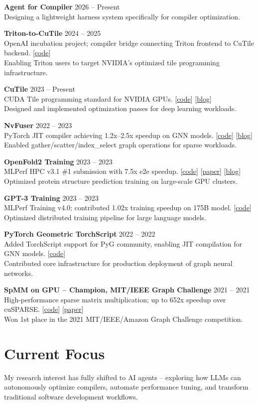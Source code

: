 \documentclass[11pt,a4paper]{article}
\newcommand{\projectentry}[5]{%
    \noindent\textbf{#1} \hfill #2 \\[2pt]
    #4 \hfill {\small #3} \\[1pt]
    #5\par\vspace{8pt}%
}
\newcommand{\projectentrysingle}[3]{%
    \noindent\textbf{#1} \hfill #2 \\[2pt]
    #3\par\vspace{8pt}%
}
\begin{document}
\projectentrysingle{Agent for Compiler}{2026 -- Present}
{Designing a lightweight harness system specifically for compiler optimization.}

\projectentry{Triton-to-CuTile}{2024 -- 2025}{[\href{https://github.com/triton-lang/Triton-to-tile-IR}{code}]}
{OpenAI incubation project; compiler bridge connecting Triton frontend to CuTile backend.}
{Enabling Triton users to target NVIDIA's optimized tile programming infrastructure.}

\projectentry{CuTile}{2023 -- Present}{[\href{https://github.com/NVIDIA/cutile-python}{code}] [\href{https://developer.nvidia.com/blog/tag/cutile/}{blog}]}
{CUDA Tile programming standard for NVIDIA GPUs.}
{Designed and implemented optimization passes for deep learning workloads.}

\projectentry{NvFuser}{2022 -- 2023}{[\href{https://github.com/csarofeen/pytorch/commits/devel/?author=ftxj}{code}] [\href{https://pytorch.org/blog/introducing-nvfuser-a-deep-learning-compiler-for-pytorch/}{blog}]}
{PyTorch JIT compiler achieving 1.2x--2.5x speedup on GNN models.}
{Enabled gather/scatter/index\_select graph operations for sparse workloads.}

\projectentry{OpenFold2 Training}{2023 -- 2023}{[\href{https://github.com/mlcommons/hpc_results_v3.0/tree/main/NVIDIA/benchmarks/openfold}{code}] [\href{https://arxiv.org/abs/2404.11068}{paper}] [\href{https://developer.nvidia.com/blog/optimizing-openfold-training-for-drug-discovery/}{blog}]}
{MLPerf HPC v3.1 \#1 submission with 7.5x e2e speedup.}
{Optimized protein structure prediction training on large-scale GPU clusters.}

\projectentry{GPT-3 Training}{2023 -- 2023}{[\href{https://github.com/NVIDIA/Megatron-LM}{code}]}
{MLPerf Training v4.0; contributed 1.02x training speedup on 175B model.}
{Optimized distributed training pipeline for large language models.}

\projectentry{PyTorch Geometric TorchScript}{2022 -- 2022}{[\href{https://github.com/pyg-team/pytorch_geometric/commits/master/?author=ftxj}{code}]}
{Added TorchScript support for PyG community, enabling JIT compilation for GNN models.}
{Contributed core infrastructure for production deployment of graph neural networks.}

\projectentry{SpMM on GPU -- Champion, MIT/IEEE Graph Challenge}{2021 -- 2021}{[\href{https://github.com/CGCL-codes/Graphchallenge21}{code}] [\href{https://ieeexplore.ieee.org/document/9622791}{paper}]}
{High-performance sparse matrix multiplication; up to 652x speedup over cuSPARSE.}
{Won 1st place in the 2021 MIT/IEEE/Amazon Graph Challenge competition.}

\vspace{4pt}

\section{Current Focus}

\noindent My research interest has fully shifted to AI agents -- exploring how LLMs can autonomously optimize compilers, automate performance tuning, and transform traditional software development workflows.
\end{document}
